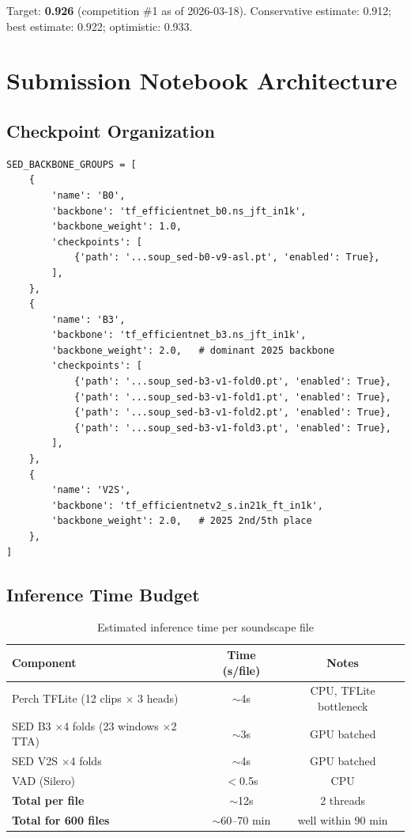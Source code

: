 \documentclass[11pt,a4paper]{article}
\begin{document}
\noindent Target: \textbf{0.926} (competition \#1 as of 2026-03-18). Conservative
estimate: 0.912; best estimate: 0.922; optimistic: 0.933.

\section{Submission Notebook Architecture}
\label{sec:notebook}

\subsection{Checkpoint Organization}

\begin{lstlisting}[caption=SED checkpoint group definition]
SED_BACKBONE_GROUPS = [
    {
        'name': 'B0',
        'backbone': 'tf_efficientnet_b0.ns_jft_in1k',
        'backbone_weight': 1.0,
        'checkpoints': [
            {'path': '...soup_sed-b0-v9-asl.pt', 'enabled': True},
        ],
    },
    {
        'name': 'B3',
        'backbone': 'tf_efficientnet_b3.ns_jft_in1k',
        'backbone_weight': 2.0,   # dominant 2025 backbone
        'checkpoints': [
            {'path': '...soup_sed-b3-v1-fold0.pt', 'enabled': True},
            {'path': '...soup_sed-b3-v1-fold1.pt', 'enabled': True},
            {'path': '...soup_sed-b3-v1-fold2.pt', 'enabled': True},
            {'path': '...soup_sed-b3-v1-fold3.pt', 'enabled': True},
        ],
    },
    {
        'name': 'V2S',
        'backbone': 'tf_efficientnetv2_s.in21k_ft_in1k',
        'backbone_weight': 2.0,   # 2025 2nd/5th place
    },
]
\end{lstlisting}

\subsection{Inference Time Budget}

\begin{table}[H]
\centering
\caption{Estimated inference time per soundscape file}
\begin{tabular}{lcc}
\toprule
\textbf{Component} & \textbf{Time (s/file)} & \textbf{Notes} \\
\midrule
Perch TFLite (12 clips $\times$ 3 heads) & $\sim$4s & CPU, TFLite bottleneck \\
SED B3 $\times$4 folds (23 windows $\times$2 TTA) & $\sim$3s & GPU batched \\
SED V2S $\times$4 folds & $\sim$4s & GPU batched \\
VAD (Silero) & $<$0.5s & CPU \\
\midrule
\textbf{Total per file} & $\sim$12s & 2 threads \\
\textbf{Total for 600 files} & $\sim$60--70 min & well within 90 min \\
\bottomrule
\end{tabular}
\end{table}
\end{document}
